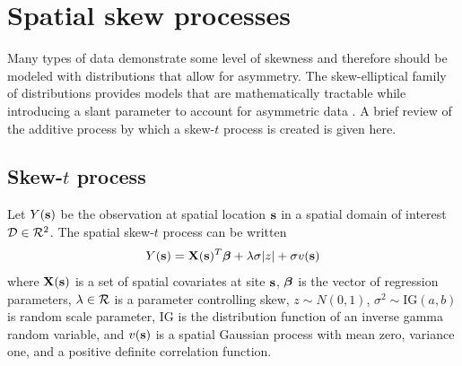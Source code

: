 \documentclass[11pt]{article}
\begin{document}

\section{Spatial skew processes}\label{s:spatialskew}
Many types of data demonstrate some level of skewness and therefore should be modeled with distributions that allow for asymmetry.
The skew-elliptical family of distributions provides models that are mathematically tractable while introducing a slant parameter to account for asymmetric data \citep{Azzalini2014}.
A brief review of the additive process by which a skew-$t$ process is created is given here.

\subsection{Skew-$t$ process} \label{s:skewt}
Let $Y(\mbox{\bf s})$ be the observation at spatial location $\mbox{\bf s}$ in a spatial domain of interest ${\cal D} \in {\cal R}^2$.
The spatial skew-$t$ process can be written
\begin{align}
  Y(\mbox{\bf s}) = \mbox{\bf X}(\mbox{\bf s})^T \mbox{\boldmath $\beta$} + \lambda \sigma |z| + \sigma v(\mbox{\bf s})
\end{align}
where $\mbox{\bf X}(\mbox{\bf s})$ is a set of spatial covariates at site $\mbox{\bf s}$, $\mbox{\boldmath $\beta$}$ is the vector of regression parameters, $\lambda \in {\cal R}$ is a parameter controlling skew, $z \sim N(0, 1)$, $\sigma^2 \sim \text{IG}(a, b)$ is random scale parameter, IG is the distribution function of an inverse gamma random variable, and $v(\mbox{\bf s})$ is a spatial Gaussian process with mean zero, variance one, and a positive definite correlation function.
\end{document}
